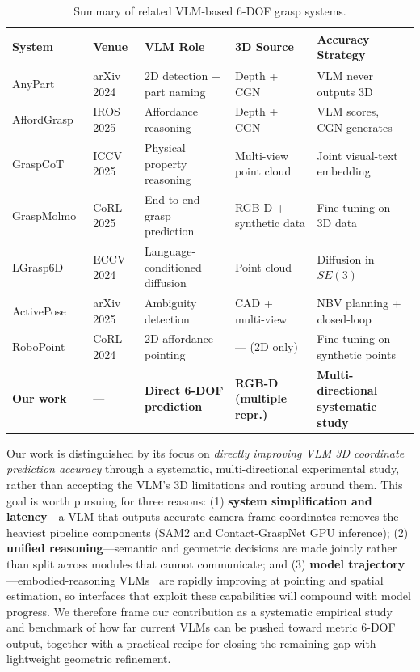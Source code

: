 \documentclass[11pt,a4paper]{article}
\begin{document}
\begin{table}[H]
\centering
\caption{Summary of related VLM-based 6-DOF grasp systems.}
\label{tab:related}
\begin{tabular}{@{}p{2.3cm}p{1.7cm}p{2.9cm}p{3.3cm}p{3.2cm}@{}}
\toprule
\textbf{System} & \textbf{Venue} & \textbf{VLM Role} & \textbf{3D Source} & \textbf{Accuracy Strategy} \\
\midrule
AnyPart~\cite{anypart2024} & arXiv 2024 & 2D detection + part naming & Depth + CGN & VLM never outputs 3D \\
AffordGrasp~\cite{affordgrasp} & IROS 2025 & Affordance reasoning & Depth + CGN & VLM scores, CGN generates \\
GraspCoT~\cite{graspcot} & ICCV 2025 & Physical property reasoning & Multi-view point cloud & Joint visual-text embedding \\
GraspMolmo~\cite{graspmolmo} & CoRL 2025 & End-to-end grasp prediction & RGB-D + synthetic data & Fine-tuning on 3D data \\
LGrasp6D~\cite{lgrasp6d} & ECCV 2024 & Language-conditioned diffusion & Point cloud & Diffusion in $SE(3)$ \\
ActivePose~\cite{activepose} & arXiv 2025 & Ambiguity detection & CAD + multi-view & NBV planning + closed-loop \\
RoboPoint~\cite{yuan2024robopoint} & CoRL 2024 & 2D affordance pointing & --- (2D only) & Fine-tuning on synthetic points \\
\hline
\textbf{Our work} & --- & \textbf{Direct 6-DOF prediction} & \textbf{RGB-D (multiple repr.)} & \textbf{Multi-directional systematic study} \\
\bottomrule
\end{tabular}
\end{table}

Our work is distinguished by its focus on \textit{directly improving VLM 3D coordinate prediction accuracy} through a systematic, multi-directional experimental study, rather than accepting the VLM's 3D limitations and routing around them. This goal is worth pursuing for three reasons: (1) \textbf{system simplification and latency}---a VLM that outputs accurate camera-frame coordinates removes the heaviest pipeline components (SAM2 and Contact-GraspNet GPU inference); (2) \textbf{unified reasoning}---semantic and geometric decisions are made jointly rather than split across modules that cannot communicate; and (3) \textbf{model trajectory}---embodied-reasoning VLMs~\cite{gemini2025robotics,deitke2025molmo} are rapidly improving at pointing and spatial estimation, so interfaces that exploit these capabilities will compound with model progress. We therefore frame our contribution as a systematic empirical study and benchmark of how far current VLMs can be pushed toward metric 6-DOF output, together with a practical recipe for closing the remaining gap with lightweight geometric refinement.
\end{document}
